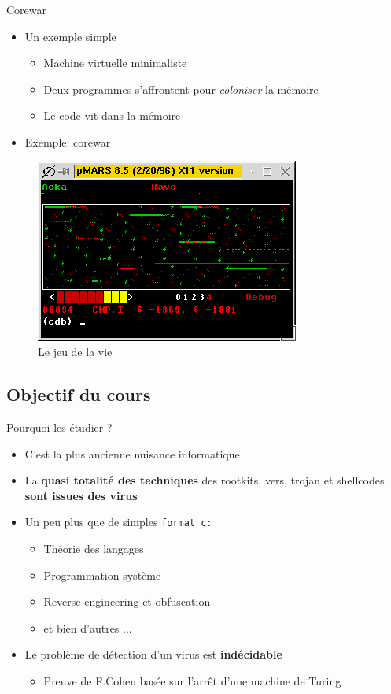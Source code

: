 \documentclass{beamer}
\begin{document}
\begin{frame}{Corewar}
\begin{itemize}
\item Un exemple simple
\begin{itemize}
\item Machine virtuelle minimaliste
\item Deux programmes s'affrontent pour \textit{coloniser} la mémoire
\item Le code vit dans la mémoire
\end{itemize}
\item Exemple: corewar
\end{itemize}
\begin{figure}[!ht]
\includegraphics[scale=0.5]{corewar.png}
\center
\caption{Le jeu de la vie}
\end{figure}

\end{frame}


\subsection{Objectif du cours}
\begin{frame}{Pourquoi les étudier ?}
\begin{itemize}
\item C'est la plus ancienne nuisance informatique
\item La \textbf{quasi totalité des techniques} des rootkits, vers, trojan et shellcodes \textbf{sont issues des virus}
\item Un peu plus que de simples \texttt{format c:}
\begin{itemize}
\item Théorie des langages
\item Programmation système
\item Reverse engineering et obfuscation
\item et bien d'autres ...
\end{itemize}
\item Le problème de détection d'un virus est \textbf{indécidable}
\begin{itemize}
\item Preuve de F.Cohen basée sur l'arrêt d'une machine de Turing
\end{itemize}
\end{itemize}
\end{frame}
\end{document}
